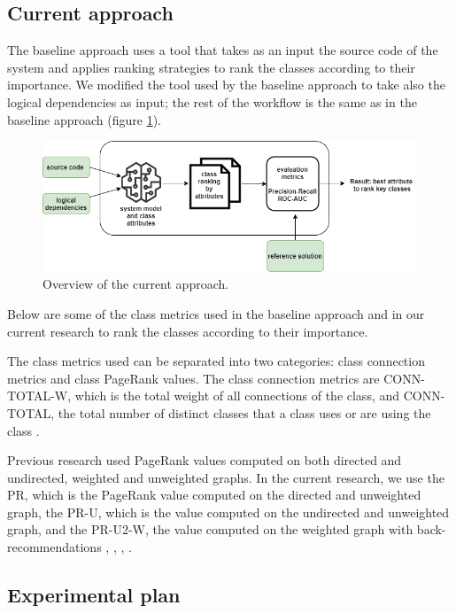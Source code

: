 \documentclass[runningheads]{comsis2}
\begin{document}
\subsection{Current approach}
\label{sec:current_approach}
The baseline approach uses a tool that takes as an input the source code of the system and applies ranking strategies to rank the classes according to their importance. We modified the tool used by the baseline approach to take also the logical dependencies as input; the rest of the workflow is the same as in the baseline approach (figure \ref{fig:baseline_approach}).

\begin{figure}
\centering
\includegraphics[width=\textwidth]{current_approach.PNG}
\caption{Overview of the current approach.}
\label{fig:baseline_approach}
\centering
\end{figure}
Below are some of the class metrics used in the baseline approach and in our current research to rank the classes according to their importance. 

The class metrics used can be separated into two categories: class connection metrics and class PageRank values.
The class connection metrics are CONN-TOTAL-W, which is the total weight of all connections of the class, and CONN-TOTAL, the total number of distinct classes that a class uses or are using the class \cite{Finding-key-classes}.

Previous research used PageRank values computed on both directed and undirected, weighted and unweighted graphs. In the current research, we use the PR, which is the PageRank value computed on the directed and unweighted graph, the PR-U, which is the value computed on the undirected and unweighted graph, and the PR-U2-W, the value computed on the weighted graph with back-recommendations \cite{PagerankENASE}, \cite{enase15}, \cite{Finding-key-classes}, \cite{PagerankSACI}.


\subsection{Experimental plan}
\label{sec:plan}
\end{document}

